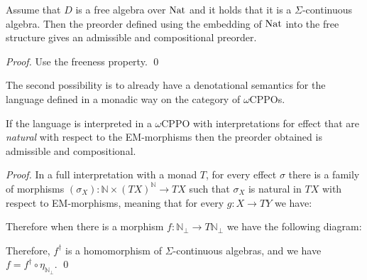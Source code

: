 \begin{example}
    \label{lem:freealgebra}
    Assume that $D$ is a free algebra
    over $\textnormal{Nat}$ and it holds that it 
    is a $\Sigma$-continuous algebra.
    Then the preorder defined using the embedding 
    of $\textnormal{Nat}$ into the free structure gives 
    an admissible and compositional preorder.
\end{example}


    \begin{proof}
        Use the freeness property.
    \qed\end{proof}


The second possibility is to already have a denotational semantics 
for the language defined in a monadic way on the category of $\omega$CPPOs.

\begin{example}
    If the language is interpreted in a $\omega$CPPO with 
    interpretations for effect that are \emph{natural}
    with respect to the EM-morphisms then the
    preorder obtained is admissible and compositional.
\end{example}


\begin{proof}
    In a full interpretation with a monad $T$, for every effect $\sigma$
    there is a family of morphisms $(\sigma_X) : \mathbb{N} \times (T X)^\mathbb{N} \to T X$
    such that $\sigma_X$ is natural in $T X$ with respect to EM-morphisms, meaning that for 
    every $g : X \to T Y$ we have:

    \begin{center}
    \end{center}

    Therefore when there is a morphism 
    $f : \mathbb{N}_\bot \to T \mathbb{N}_\bot$
    we have the following diagram:

    \begin{center}
    \end{center}

    Therefore, $f^\dagger$ is a homomorphism of $\Sigma$-continuous algebras,
    and we have 
    $f = f^\dagger \circ \eta_{\mathbb{N}_\bot}$.
\qed\end{proof}

